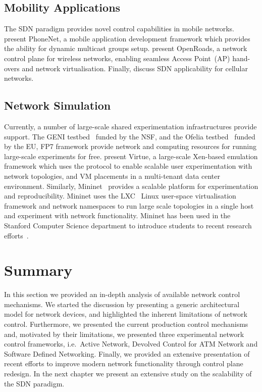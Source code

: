 \subsection{Mobility Applications}

The SDN paradigm provides novel control capabilities in mobile networks.
 present PhoneNet, a mobile application development framework
which provides the ability for dynamic multicast groups setup.
 present OpenRoads, a network control plane for wireless
networks, enabling seamless Access Point~(AP) hand-overs and network
virtualisation.  Finally,  discuss SDN applicability for
cellular networks.

\subsection{Network Simulation}

Currently, a number of large-scale shared experimentation infrastructures provide
\of support. The GENI testbed~ funded by the NSF, and the Ofelia
testbed~ funded by the EU, FP7 framework provide network and
computing resources for running large-scale experiments for free.  
present Virtue, a large-scale Xen-based emulation framework which uses the \of
protocol to enable scalable user experimentation with network topologies, and VM
placements in a multi-tenant data center environment. Similarly,
Mininet~  provides a scalable platform  for \of
experimentation and reproducibility. Mininet uses the LXC~ Linux
user-space virtualisation framework and network namespaces to run large scale
topologies in a single host and experiment with network functionality.  Mininet
has been used in the Stanford Computer Science department to introduce students
to recent research efforts~. 

\section{Summary}

In this section we provided an in-depth analysis of available network control
mechanisms.  We started the discussion by presenting a generic architectural
model for network devices, and highlighted the inherent limitations of network
control. Furthermore, we presented the current production  control mechanisms
and, motivated by their limitations, we presented three experimental network
control frameworks, i.e.~Active Network, Devolved Control for ATM Network and
Software Defined Networking. Finally, we provided an extensive presentation of
recent efforts to improve modern network functionality through control plane
redesign. In the next chapter we present an extensive study on the scalability
of the SDN paradigm. 

